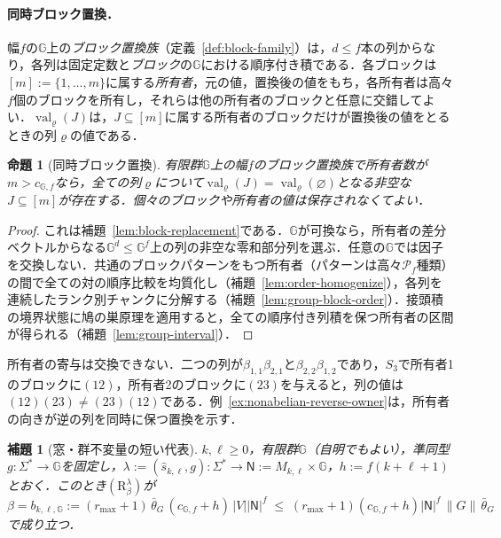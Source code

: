 \documentclass[11pt,a4paper]{ltjsarticle}
\numberwithin{equation}{section}
\theoremstyle{plain}
\newtheorem{lemma}[theorem]{補題}
\newtheorem{proposition}[theorem]{命題}
\theoremstyle{definition}
\theoremstyle{remark}
\begin{document}
\paragraph{同時ブロック置換．}
幅$f$の${\mathbb G}$上の\emph{ブロック置換族}（定義~\ref{def:block-family}）は，$d\le f$本の列からなり，各列は固定定数と\emph{ブロック}の${\mathbb G}$における順序付き積である．各ブロックは$[m]:=\{1,\ldots,m\}$に属する\emph{所有者}，元の値，置換後の値をもち，各所有者は高々$f$個のブロックを所有し，それらは他の所有者のブロックと任意に交錯してよい．$\operatorname{val}_\varrho(J)$は，$J\subseteq[m]$に属する所有者のブロックだけが置換後の値をとるときの列$\varrho$の値である．

\begin{proposition}[同時ブロック置換]
\label{prop:block-replacement-interface}
有限群${\mathbb G}$上の幅$f$のブロック置換族で所有者数が$m>c_{{\mathbb G},f}$なら，全ての列$\varrho$について$\operatorname{val}_\varrho(J)=\operatorname{val}_\varrho(\varnothing)$となる非空な$J\subseteq[m]$が存在する．個々のブロックや所有者の値は保存されなくてよい．
\end{proposition}

\begin{proof}
これは補題~\ref{lem:block-replacement}である．${\mathbb G}$が可換なら，所有者の差分ベクトルからなる${\mathbb G}^d\le {\mathbb G}^f$上の列の非空な零和部分列を選ぶ．任意の${\mathbb G}$では因子を交換しない．共通のブロックパターンをもつ所有者（パターンは高々$\mathcal P_f$種類）の間で全ての対の順序比較を均質化し（補題~\ref{lem:order-homogenize}），各列を連続したランク別チャンクに分解する（補題~\ref{lem:group-block-order}）．接頭積の境界状態に鳩の巣原理を適用すると，全ての順序付き列積を保つ所有者の区間が得られる（補題~\ref{lem:group-interval}）．
\end{proof}

所有者の寄与は交換できない．二つの列が$\beta_{1,1}\beta_{2,1}$と$\beta_{2,2}\beta_{1,2}$であり，$S_3$で所有者1のブロックに$(12)$，所有者2のブロックに$(23)$を与えると，列の値は$(12)(23)\ne(23)(12)$である．例~\ref{ex:nonabelian-reverse-owner}は，所有者の向きが逆の列を同時に保つ置換を示す．

\begin{lemma}[窓・群不変量の短い代表]
\label{lem:marked-heavy-window-group}
$k,\ell\ge0$，有限群${\mathbb G}$（自明でもよい），準同型$g:\Sigma^*\to {\mathbb G}$を固定し，$\lambda:=(\widehat s_{k,\ell},g):\Sigma^*\to\mathsf N:=M_{k,\ell}\times {\mathbb G}$，$h:=f(k+\ell+1)$とおく．このとき$(\mathrm R_\beta^\lambda)$が
\[
 \beta=b_{k,\ell,{\mathbb G}}:=(r_{\max}+1)\,\bar\theta_G\,(c_{{\mathbb G},f}+h)\,|V||\mathsf N|^f
 \;\le\;(r_{\max}+1)(c_{{\mathbb G},f}+h)|\mathsf N|^f\,\|G\|\,\bar\theta_G
\]
で成り立つ．
\end{lemma}
\end{document}
